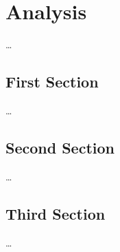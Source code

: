 
\chapter{Analysis}
\label{ch:Analysis}

\dots

\section{First Section}
\label{sec:Analysis:FirstSection}

\dots

\section{Second Section}
\label{sec:Methodology:SecondSection}

\dots

\section{Third Section}
\label{sec:Methodology:ThirdSection}

\dots
